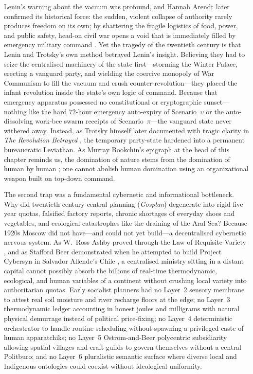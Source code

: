 Lenin's warning about the vacuum was profound, and Hannah Arendt later confirmed its historical force: the sudden, violent collapse of authority rarely produces freedom on its own; by shattering the fragile logistics of food, power, and public safety, head-on civil war opens a void that is immediately filled by emergency military command \parencite{arendt1963}. Yet the tragedy of the twentieth century is that Lenin and Trotsky's own method betrayed Lenin's insight. Believing they had to seize the centralised machinery of the state first---storming the Winter Palace, erecting a vanguard party, and wielding the coercive monopoly of War Communism to fill the vacuum and crush counter-revolution---they placed the infant revolution inside the state's own logic of command. Because that emergency apparatus possessed no constitutional or cryptographic sunset---nothing like the hard 72-hour emergency auto-expiry of Scenario~$\upsilon$ or the auto-dissolving work-bee swarm receipts of Scenario~$\pi$---the vanguard state never withered away. Instead, as Trotsky himself later documented with tragic clarity in \textit{The Revolution Betrayed} \parencite{trotsky1937}, the temporary party-state hardened into a permanent bureaucratic Leviathan. As Murray Bookchin's epigraph at the head of this chapter reminds us, the domination of nature stems from the domination of human by human \parencite{bookchin1982}; one cannot abolish human domination using an organizational weapon built on top-down command.

The second trap was a fundamental cybernetic and informational bottleneck. Why did twentieth-century central planning (\textit{Gosplan}) degenerate into rigid five-year quotas, falsified factory reports, chronic shortages of everyday shoes and vegetables, and ecological catastrophes like the draining of the Aral Sea? Because 1920s Moscow did not have---and could not yet build---a decentralised cybernetic nervous system. As W.~Ross Ashby proved through the Law of Requisite Variety \parencite{ashby1956}, and as Stafford Beer demonstrated when he attempted to build Project Cybersyn in Salvador Allende's Chile \parencite{beer1972,beer1974}, a centralised ministry sitting in a distant capital cannot possibly absorb the billions of real-time thermodynamic, ecological, and human variables of a continent without crushing local variety into authoritarian quotas. Early socialist planners had no Layer~2 sensory membrane to attest real soil moisture and river recharge floors at the edge; no Layer~3 thermodynamic ledger accounting in honest joules and milligrams with natural physical demurrage instead of political price-fixing; no Layer~4 deterministic orchestrator to handle routine scheduling without spawning a privileged caste of human apparatchiks; no Layer~5 Ostrom-and-Beer polycentric subsidiarity \parencite{ostrom1990} allowing spatial villages and craft guilds to govern themselves without a central Politburo; and no Layer~6 pluralistic semantic surface where diverse local and Indigenous ontologies could coexist without ideological uniformity.

